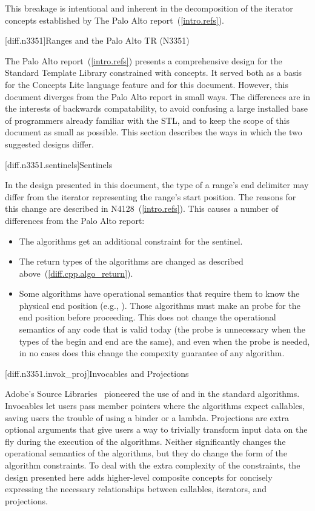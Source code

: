 \pnum
This breakage is intentional and inherent in the decomposition of the iterator concepts established
by The Palo Alto report~(\ref{intro.refs}).

[diff.n3351]{Ranges and the Palo Alto TR (N3351)}

\pnum
The Palo Alto report~(\ref{intro.refs}) presents a comprehensive design for the Standard Template
Library constrained with concepts. It served both as a basis for the Concepts Lite language feature
and for this document. However, this document diverges from the Palo Alto report in small ways. The
differences are in the interests of backwards compatability, to avoid confusing a large installed
base of programmers already familiar with the STL, and to keep the scope of this document as small
as possible. This section describes the ways in which the two suggested designs differ.

[diff.n3351.sentinels]{Sentinels}

\pnum
In the design presented in this document, the type of a range's end delimiter may differ from the
iterator representing the range's start position. The reasons for this change are described in
N4128~(\ref{intro.refs}). This causes a number of differences from the Palo Alto report:

\begin{itemize}
\item The algorithms get an additional constraint for the sentinel.
\item The return types of the algorithms are changed as described above~(\ref{diff.cpp.algo_return}).
\item Some algorithms have operational semantics that require them to know the
physical end position (e.g., ). Those algorithms must make an  probe for
the end position before proceeding. This does not change the operational semantics of any code that
is valid today (the probe is unnecessary when the types of the begin and end are the
same), and even when the probe is needed, in no cases does this change the compexity guarantee of
any algorithm.
\end{itemize}

[diff.n3351.invok_proj]{Invocables and Projections}

\pnum
Adobe's Source Libraries~\cite{ASL} pioneered the use of  and
 in the standard algorithms. Invocables let users pass member pointers
where the algorithms expect callables, saving users the trouble of using a binder or a lambda.
Projections are extra optional arguments that give users a way to trivially transform input data
on the fly during the execution of the algorithms. Neither significantly changes the operational
semantics of the algorithms, but they do change the form of the algorithm constraints. To deal with
the extra complexity of the constraints, the design presented here adds higher-level composite
concepts for concisely expressing the necessary relationships between callables, iterators, and
projections.

